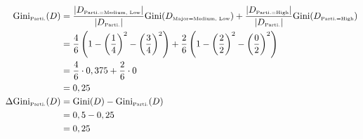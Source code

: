 \documentclass[
english,
smallborders
]{i6prcsht}
\newcommand{\OfSpecificValue}[3]{_{\text{\tiny #1#2#3}}}
\newcommand{\OfAttribute}[1]{_{\text{\tiny #1}}}
\begin{document}
\begin{solution}
\begin{enumerate}
\begin{enumerate}
\begin{enumerate}
\begin{enumerate}
					                        \begin{alignat*}{2}
						                        \text{Gini}\OfAttribute{Parti.}(D)       & = \frac{|D\OfSpecificValue{Parti.}{=}{Medium, Low}|}{|D\OfAttribute{Parti.}|} \text{Gini}(D\OfSpecificValue{Major}{=}{Medium, Low}) + \frac{|D\OfSpecificValue{Parti.}{=}{High}|}{|D\OfAttribute{Parti.}|} \text{Gini}(D\OfSpecificValue{Parti.}{=}{High}) \\
						                                                                 & = \frac{4}{6} \left(1 - \left(\frac{1}{4}\right)^2 - \left(\frac{3}{4}\right)^2\right) + \frac{2}{6} \left(1 - \left(\frac{2}{2}\right)^2 - \left(\frac{0}{2}\right)^2\right)                                                                              \\
						                                                                 & = \frac{4}{6} \cdot 0,375 + \frac{2}{6} \cdot 0                                                                                                                                                                                                            \\
						                                                                 & = 0,25                                                                                                                                                                                                                                                     \\
						                        \Delta\text{Gini}\OfAttribute{Parti.}(D) & = \text{Gini}(D) - \text{Gini}\OfAttribute{Parti.}(D)                                                                                                                                                                                                      \\
						                                                                 & = 0,5 - 0,25                                                                                                                                                                                                                                               \\
						                                                                 & = 0,25                                                                                                                                                                                                                                                     \\
					                        \end{alignat*}
				                  \end{enumerate}
				                  

\end{enumerate}
\end{enumerate}
\end{enumerate}
\end{solution}
\end{document}
